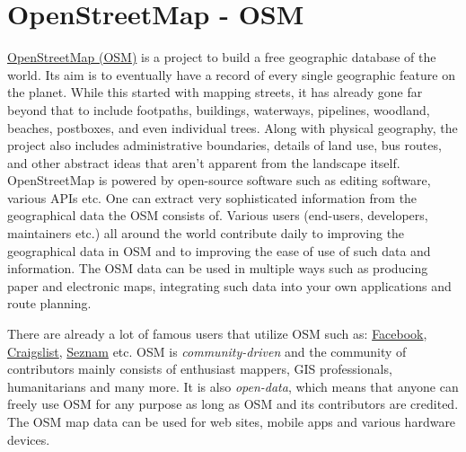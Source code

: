 \section{OpenStreetMap - OSM}
\href{https://www.openstreetmap.org/}{OpenStreetMap (OSM)} is a project to build a free geographic database of the world. Its aim is to eventually have a record of every single geographic feature on the planet. While this started with mapping streets, it has already gone far beyond that to include footpaths, buildings, waterways, pipelines, woodland, beaches, postboxes, and even individual trees. Along with physical geography, the project also includes administrative boundaries, details of land use, bus routes, and other abstract ideas that aren't apparent from the landscape itself. \cite{AboutOSMPackt}\\
\newline
OpenStreetMap is powered by open-source software such as editing software, various APIs etc. One can extract very sophisticated information from the geographical data the OSM consists of. Various users (end-users, developers, maintainers etc.) all around the world contribute daily to improving the geographical data in OSM and to improving the ease of use of such data and information. The OSM data can be used in multiple ways such as producing paper and electronic maps, integrating such data into your own applications and route planning.\\
\newline

There are already a lot of famous users that utilize OSM such as: \href{https://www.facebook.com/}{Facebook}, \href{https://www.craigslist.org/}{Craigslist}, \href{https://www.seznam.cz/}{Seznam} etc. OSM is \textit{community-driven} and the community of contributors mainly consists of enthusiast mappers, GIS professionals, humanitarians and many more. It is also \textit{open-data}, which means that anyone can freely use OSM for any purpose as long as OSM and its contributors are credited. The OSM map data can be used for web sites, mobile apps and various hardware devices.
\newpage
